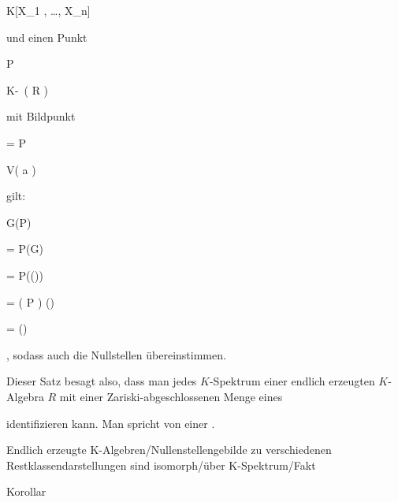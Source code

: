 {{\vergleichskette

{ 
}

{ \in }{ K[X_1 , \ldots , X_n]
}

{  }{
}

{    }{
}

{   }{
}

}
{}{}{}
und einen Punkt


\mavergleichskette

{\vergleichskette

{ P
}

{ \in }{ K\!-\!\, \left(  R  \right)
}

{  }{
}

{    }{
}

{   }{
}

}
{}{}{}
mit Bildpunkt


\mavergleichskette

{\vergleichskette

{ 
}

{ = }{ P \circ \varphi
}

{ \in }{ V( {\mathfrak a} )
}

{    }{
}

{   }{
}

}
{}{}{}
gilt:


\mavergleichskettedisp

{\vergleichskette

{ G(P)
}

{ =} { P(G)
}

{ =} { P(\varphi())
}

{ =} { ( P \circ \varphi ) ()
}

{ =} {  ()
}

}
{}{}{,}
sodass auch die Nullstellen übereinstimmen.


}


Dieser Satz besagt also, dass man jedes $K$-Spektrum einer endlich erzeugten $K$-Algebra $R$ mit einer Zariski-abgeschlossenen Menge eines

 identifizieren kann. Man spricht von einer  {.}



{Endlich erzeugte K-Algebren/Nullenstellengebilde zu verschiedenen Restklassendarstellungen sind isomorph/über K-Spektrum/Fakt}

{Korollar}

{}

